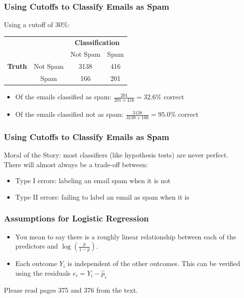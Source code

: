 \documentclass[slides]{beamer}
\newcommand{\blue}[1]{\textcolor{blue2}{#1}}
\begin{document}
\begin{frame}[fragile]
\frametitle{Using Cutoffs to Classify Emails as Spam}

Using a cutoff of 30\%:
\begin{center}
  \begin{tabular}{cc|cc}
     \multicolumn{2}{c}{}  & \multicolumn{2}{c}{\textbf{Classification}} \\ 
     &  & Not Spam & Spam \\ 
\hline
    \textbf{Truth} & Not Spam & 3138 & 416\\
     & Spam & 166 & 201\\ 
    \hline
  \end{tabular}
\end{center}
\pause
\begin{itemize}
\item Of the emails classified as spam:  $\frac{201}{201+416} = 32.6\%$ correct
\item Of the emails classified not as spam:  $\frac{3138}{3138+166} = 95.0\%$ correct
\end{itemize}

\end{frame}


\begin{frame}[fragile]
\frametitle{Using Cutoffs to Classify Emails as Spam}

\blue{Moral of the Story}:  most classifiers (like hypothesis tests) are never perfect.  There will almost always be a trade-off between:  
\begin{itemize}
\item Type I errors:  labeling an email spam when it is not
\item Type II errors:  failing to label an email as spam when it is 
\end{itemize}

\end{frame}


\begin{frame}[fragile]
\frametitle{Assumptions for Logistic Regression}
\begin{itemize}
\pause\item You mean to say there is a roughly linear relationship between each of the predictors and $\log\left(\frac{p}{1-p}\right)$.
\pause\item Each outcome $Y_i$ is independent of the other outcomes.  This can be verified using the residuals $e_i = Y_i - \widehat{p}_i$
\end{itemize}

\pause Please read pages 375 and 376 from the text.  



\end{frame}
\end{document}
